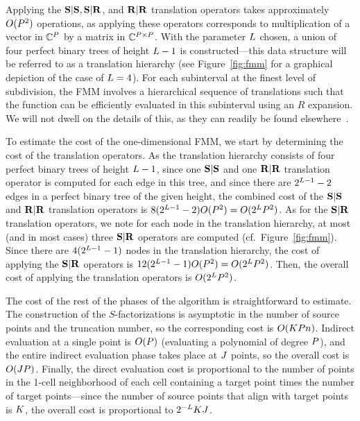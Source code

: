 Applying the $\bold{S}|\bold{S}, \bold{S}|\bold{R}$, and $\bold{R}|\bold{R}$ translation operators
takes approximately $O(P^2)$ operations, as applying these
operators corresponds to multiplication of a vector in $\mathbb{C}^P$
by a matrix in $\mathbb{C}^{P\times P}$. With the parameter
$L$ chosen, a union of four perfect binary trees of height
$L - 1$ is constructed---this data structure will be referred
to as a translation hierarchy (see Figure~\ref{fig:fmm} for a
graphical depiction of the case of $L = 4$). For each
subinterval at the finest level of subdivision, the FMM involves a
hierarchical sequence of translations such that the function can be
efficiently evaluated in this subinterval using an $R$ expansion. We
will not dwell on the details of this, as they can readily be found
elsewhere~\cite{fmm-helmholtz, fmm-orig}.

To estimate the cost of the one-dimensional FMM, we start by
determining the cost of the translation operators. As the translation
hierarchy consists of four perfect binary trees of height
$L - 1$, since one $\bold{S}|\bold{S}$ and one $\bold{R}|\bold{R}$ translation operator is
computed for each edge in this tree, and since there are
$2^{L-1} - 2$ edges in a perfect binary tree of the given
height, the combined cost of the $\bold{S}|\bold{S}$ and $\bold{R}|\bold{R}$ translation operators
is $8(2^{L-1} - 2)O(P^2) =
O(2^LP^2)$. As for the $\bold{S}|\bold{R}$ translation operators,
we note for each node in the translation hierarchy, at most (and in
most cases) three $\bold{S}|\bold{R}$ operators are computed (cf.\
Figure~\ref{fig:fmm}). Since there are $4(2^{L-1}-1)$ nodes in
the translation hierarchy, the cost of applying the $\bold{S}|\bold{R}$ operators is
$12(2^{L-1}-1)O(P^2) =
O(2^LP^2)$. Then, the overall cost of applying the
translation operators is $O(2^LP^2)$.

The cost of the rest of the phases of the algorithm is straightforward
to estimate. The construction of the $S$-factorizations is asymptotic
in the number of source points and the truncation number, so the
corresponding cost is
$O(KPn)$. Indirect evaluation at a
single point is $O(P)$ (evaluating a polynomial of degree
$P$), and the entire indirect evaluation phase takes place at
$J$ points, so the overall cost is
$O(JP)$. Finally, the direct evaluation cost is
proportional to the number of points in the 1-cell neighborhood of
each cell containing a target point times the number of target
points---since the number of source points that align with target
points is $K$, the overall cost is proportional to
$2^{-L} K J$.

